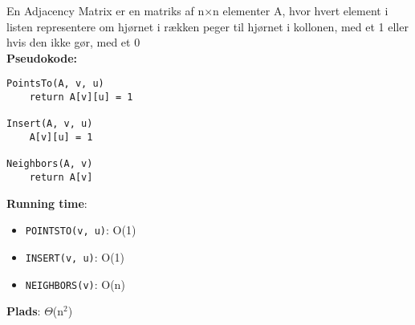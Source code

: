 En Adjacency Matrix er en matriks af n$\times$n elementer A, hvor hvert element i listen representere om hjørnet i rækken peger til hjørnet i kollonen, med et 1 eller hvis den ikke gør, med et 0\\
\textbf{Pseudokode:}
\begin{lstlisting}[frame=single, mathescape=true]
PointsTo(A, v, u)
	return A[v][u] = 1

Insert(A, v, u)
	A[v][u] = 1

Neighbors(A, v)
	return A[v]
\end{lstlisting}
\textbf{Running time}:
\begin{itemize}
	\item \texttt{POINTSTO(v, u)}: O(1)
	\item \texttt{INSERT(v, u)}: O(1)
	\item \texttt{NEIGHBORS(v)}: O(n)
\end{itemize}
\textbf{Plads}: $\Theta$(n$^2$)

